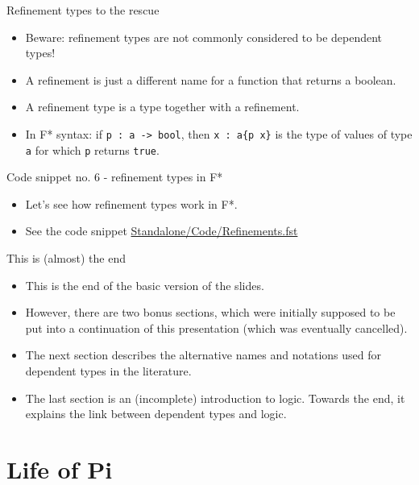 \documentclass{beamer}
\newcommand{\m}[1]{\texttt{#1}}
\begin{document}
\begin{frame}{Refinement types to the rescue}
\begin{itemize}
    \item Beware: refinement types are not commonly considered to be dependent types!
    \item A refinement is just a different name for a function that returns a boolean.
    \item A refinement type is a type together with a refinement.
    \item In F* syntax: if \m{p :\ a -> bool}, then \m{x :\ a\{p x\}} is the type of values of type \m{a} for which \m{p} returns \m{true}.
\end{itemize}
\end{frame}

\begin{frame}{Code snippet no. 6 - refinement types in F*}
\begin{itemize}
	\item Let's see how refinement types work in F*.
	\item See the code snippet \href{https://github.com/wkolowski/Dependent-Types-and-Theorem-Proving/blob/master/Standalone/Code/Refinements.fst}{Standalone/Code/Refinements.fst}
\end{itemize}
\end{frame}

\begin{frame}{This is (almost) the end}
\begin{itemize}
	\item This is the end of the basic version of the slides.
	\item However, there are two bonus sections, which were initially supposed to be put into a continuation of this presentation (which was eventually cancelled).
	\item The next section describes the alternative names and notations used for dependent types in the literature.
	\item The last section is an (incomplete) introduction to logic. Towards the end, it explains the link between dependent types and logic.
\end{itemize}
\end{frame}

\section{Life of Pi}
\end{document}
